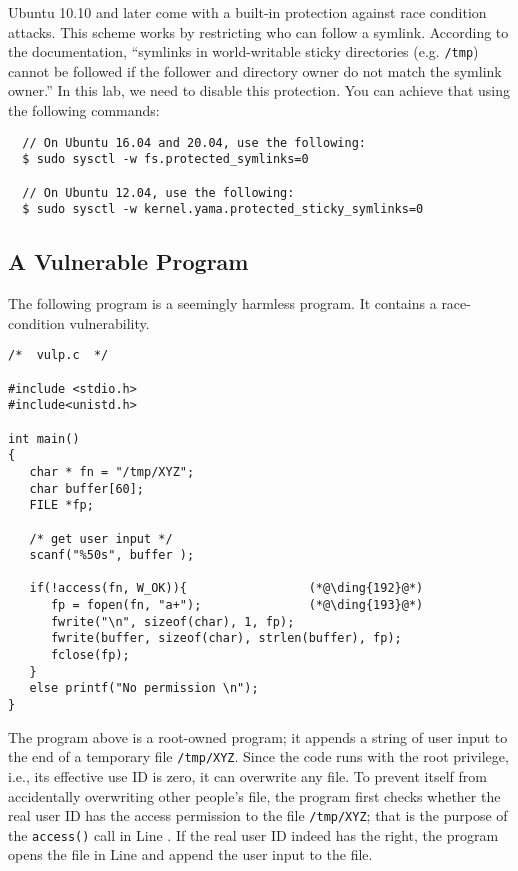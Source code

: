 Ubuntu 10.10 and later come with a built-in protection against race condition 
attacks. This scheme works by restricting who can follow a symlink. 
According to the documentation, ``symlinks in world-writable sticky 
directories (e.g. {\tt /tmp}) cannot be followed if the follower and directory 
owner do not match the symlink owner.''
In this lab, we need to disable this protection. You can achieve
that using the following commands:

\begin{lstlisting}
  // On Ubuntu 16.04 and 20.04, use the following:
  $ sudo sysctl -w fs.protected_symlinks=0

  // On Ubuntu 12.04, use the following:
  $ sudo sysctl -w kernel.yama.protected_sticky_symlinks=0
\end{lstlisting}



\subsection{A Vulnerable Program}


The following program is a seemingly harmless program. It contains a race-condition
vulnerability. 

\begin{lstlisting}
/*  vulp.c  */

#include <stdio.h>
#include<unistd.h>

int main()
{
   char * fn = "/tmp/XYZ";
   char buffer[60];
   FILE *fp;

   /* get user input */
   scanf("%50s", buffer );

   if(!access(fn, W_OK)){                 (*@\ding{192}@*)
      fp = fopen(fn, "a+");               (*@\ding{193}@*)
      fwrite("\n", sizeof(char), 1, fp);
      fwrite(buffer, sizeof(char), strlen(buffer), fp);
      fclose(fp);
   }
   else printf("No permission \n");
}
\end{lstlisting}

The program above is a root-owned \setuid program;
it appends a string of user input to
the end of a temporary file {\tt /tmp/XYZ}. Since the code runs
with the root privilege, i.e., its effective use ID is zero, it 
can overwrite any file. To prevent itself from accidentally
overwriting other people's file, the program first 
checks whether the real user ID has the access permission to the file
{\tt /tmp/XYZ}; that is the purpose of the {\tt access()} call in Line
.  If the real user ID indeed has 
the right, the program opens the file in Line  and append the user
input to the file. 

